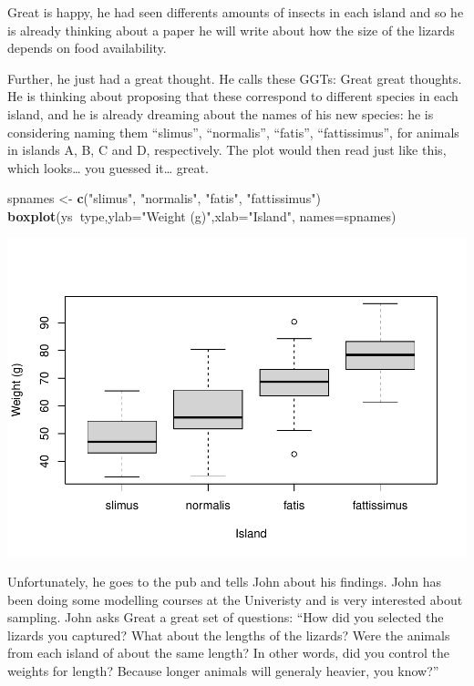 \documentclass[
]{book}
\newenvironment{Shaded}{\begin{snugshade}}{\end{snugshade}}
\newcommand{\DataTypeTok}[1]{\textcolor[rgb]{0.13,0.29,0.53}{#1}}
\newcommand{\KeywordTok}[1]{\textcolor[rgb]{0.13,0.29,0.53}{\textbf{#1}}}
\newcommand{\NormalTok}[1]{#1}
\newcommand{\OperatorTok}[1]{\textcolor[rgb]{0.81,0.36,0.00}{\textbf{#1}}}
\newcommand{\StringTok}[1]{\textcolor[rgb]{0.31,0.60,0.02}{#1}}
\begin{document}
Great is happy, he had seen differents amounts of insects in each island and so he is already thinking about a paper he will write about how the size of the lizards depends on food availability.

Further, he just had a great thought. He calls these GGTs: Great great thoughts. He is thinking about proposing that these correspond to different species in each island, and he is already dreaming about the names of his new species: he is considering naming them ``slimus'', ``normalis'', ``fatis'', ``fattissimus'', for animals in islands A, B, C and D, respectively. The plot would then read just like this, which looks\ldots{} you guessed it\ldots{} great.

\begin{Shaded}
\begin{Highlighting}[]
\NormalTok{spnames <-}\StringTok{ }\KeywordTok{c}\NormalTok{(}\StringTok{"slimus"}\NormalTok{, }\StringTok{"normalis"}\NormalTok{, }\StringTok{"fatis"}\NormalTok{, }\StringTok{"fattissimus"}\NormalTok{)}
\KeywordTok{boxplot}\NormalTok{(ys}\OperatorTok{~}\NormalTok{type,}\DataTypeTok{ylab=}\StringTok{"Weight (g)"}\NormalTok{,}\DataTypeTok{xlab=}\StringTok{"Island"}\NormalTok{,}
\DataTypeTok{names=}\NormalTok{spnames)}
\end{Highlighting}
\end{Shaded}

\includegraphics{ECOMODbook_files/figure-latex/a10.5-1.pdf}

Unfortunately, he goes to the pub and tells John about his findings. John has been doing some modelling courses at the Univeristy and is very interested about sampling.
John asks Great a great set of questions: ``How did you selected the lizards you captured? What about the lengths of the lizards? Were the animals from each island of about the same length? In other words, did you control the weights for length? Because longer animals will generaly heavier, you know?''
\end{document}
